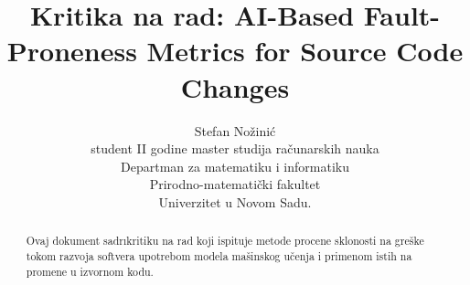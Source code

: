 \documentclass[twocolumns]{article}
\begin{document}
\title{Kritika na rad: AI-Based Fault-Proneness Metrics for Source Code Changes}
\author{Stefan Nožinić \\
student II godine master studija računarskih nauka \\
Departman za matematiku i informatiku \\
Prirodno-matematički fakultet \\
Univerzitet u Novom Sadu. \\
}

\maketitle
\begin{abstract}
    Ovaj dokument sadr\i kritiku na rad koji ispituje metode procene sklonosti na greške tokom razvoja softvera upotrebom modela mašinskog učenja i primenom istih na promene u izvornom kodu. 
\end{abstract}
\end{document}
